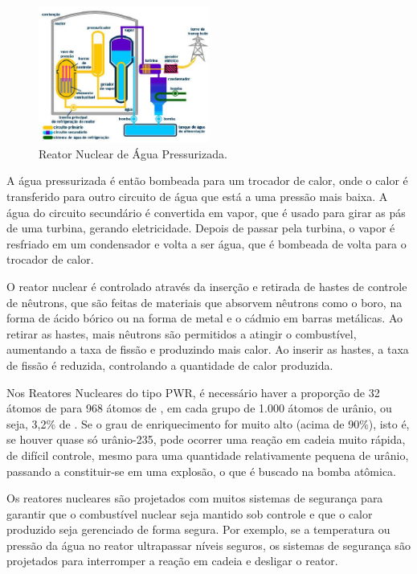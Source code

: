 \documentclass[11pt,a4paper]{article}
\newcounter{exemplo}
\begin{document}
                    \begin{figure}[h]
                        \centering
                        \includegraphics[width=0.5\textwidth]{Imagens/reatorNuclear.jpg}
                        \caption{Reator Nuclear de Água Pressurizada.}
                        \label{fig:reatorNuclear}
                    \end{figure}

                A água pressurizada é então bombeada para um trocador de calor, onde o calor é transferido para outro circuito de água que está a uma pressão mais baixa. A água do circuito secundário é convertida em vapor, que é usado para girar as pás de uma turbina, gerando eletricidade. Depois de passar pela turbina, o vapor é resfriado em um condensador e volta a ser água, que é bombeada de volta para o trocador de calor.
                
                O reator nuclear é controlado através da inserção e retirada de hastes de controle de nêutrons, que são feitas de materiais que absorvem nêutrons como o boro, na forma de ácido bórico ou na forma de metal e o cádmio em barras metálicas. Ao retirar as hastes, mais nêutrons são permitidos a atingir o combustível, aumentando a taxa de fissão e produzindo mais calor. Ao inserir as hastes, a taxa de fissão é reduzida, controlando a quantidade de calor produzida.

                Nos Reatores Nucleares do tipo PWR, é necessário haver a proporção de 32 átomos de  para 968 átomos de , em cada grupo de 1.000 átomos de urânio, ou seja, 3,2\% de . Se o grau de enriquecimento for muito alto (acima de 90\%), isto é, se houver quase só urânio-235, pode ocorrer uma reação em cadeia muito rápida, de difícil controle, mesmo para uma quantidade relativamente pequena de urânio, passando a constituir-se em uma explosão, o que é buscado na bomba atômica.
                
                Os reatores nucleares são projetados com muitos sistemas de segurança para garantir que o combustível nuclear seja mantido sob controle e que o calor produzido seja gerenciado de forma segura. Por exemplo, se a temperatura ou pressão da água no reator ultrapassar níveis seguros, os sistemas de segurança são projetados para interromper a reação em cadeia e desligar o reator.
                
\end{document}
